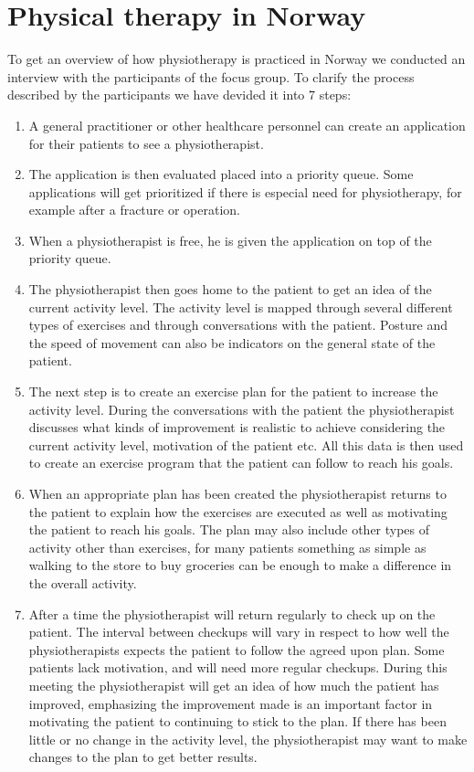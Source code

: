 \section{Physical therapy in Norway}
To get an overview of how physiotherapy is practiced in Norway we conducted an interview with the participants of the focus group. To clarify the process described by the participants we have devided it into 7 steps:
\vspace{-4mm}
\begin{enumerate}
  \item A general practitioner or other healthcare personnel can create an application for their patients to see a physiotherapist.
  \item The application is then evaluated placed into a priority queue. Some applications will get prioritized if there is especial need for physiotherapy, for example after a fracture or operation.
  \item When a physiotherapist is free, he is given the application on top of the priority queue. 
  \item The physiotherapist then goes home to the patient to get an idea of the current activity level. The activity level is mapped through several different types of exercises and through conversations with the patient. Posture and the speed of movement can also be indicators on the general state of the patient.
  \item The next step is to create an exercise plan for the patient to increase the activity level. During the conversations with the patient the physiotherapist discusses what kinds of improvement is realistic to achieve considering the current activity level, motivation of the patient etc. All this data is then used to create an exercise program that the patient can follow to reach his goals.
  \item When an appropriate plan has been created the physiotherapist returns to the patient to explain how the exercises are executed as well as motivating the patient to reach his goals. The plan may also include other types of activity other than exercises, for many patients something as simple as walking to the store to buy groceries can be enough to make a difference in the overall activity.
  \item After a time the physiotherapist will return regularly to check up on the patient. The interval between checkups will vary in respect to how well the physiotherapists expects the patient to follow the agreed upon plan. Some patients lack motivation, and will need more regular checkups. During this meeting the physiotherapist will get an idea of how much the patient has improved, emphasizing the improvement made is an important factor in motivating the patient to continuing to stick to the plan. If there has been little or no change in the activity level, the physiotherapist may want to make changes to the plan to get better results.
\end{enumerate}

